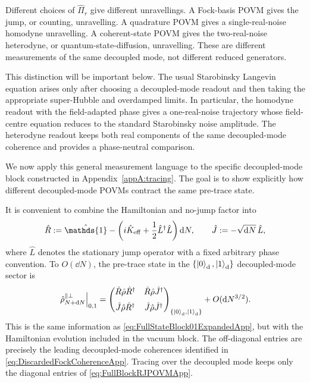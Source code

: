 \documentclass{article}
\newcommand{\openone}{\hat{\mathds{1}}}
\numberwithin{equation}{section}
\begin{document}
	Different choices of \(\hat\Pi_r\) give different unravellings. A Fock-basis POVM gives the jump, or counting, unravelling. A quadrature POVM gives a single-real-noise homodyne unravelling. A coherent-state POVM gives the two-real-noise heterodyne, or quantum-state-diffusion, unravelling. These are different measurements of the same decoupled mode, not different reduced generators.

	This distinction will be important below. The usual Starobinsky Langevin equation arises only after choosing a decoupled-mode readout and then taking the appropriate super-Hubble and overdamped limits. In particular, the homodyne readout with the field-adapted phase gives a one-real-noise trajectory whose field-centre equation reduces to the standard Starobinsky noise amplitude. The heterodyne readout keeps both real components of the same decoupled-mode coherence and provides a phase-neutral comparison.

	We now apply this general measurement language to the specific decoupled-mode block constructed in Appendix~\ref{appA:tracing}. The goal is to show explicitly how different decoupled-mode POVMs contract the same pre-trace state.

	It is convenient to combine the Hamiltonian and no-jump factor into
	\begin{equation}
		\hat R := \openone - \left( i\hat K_{\rm eff} + \frac12\hat L^\dagger\hat L \right)\dd N, \qquad \hat J := -\sqrt{\dd N}\,\hat L,
		\label{eq:RJDefPOVMApp}
	\end{equation}
	where \(\hat L\) denotes the stationary jump operator with a fixed arbitrary phase convention. To \(O(\dd N)\), the pre-trace state in the \(\{\ket{0}_{\rm d},\ket{1}_{\rm d}\}\) decoupled-mode sector is
	\begin{equation}
		\left. \hat\rho_{N+\dd N}^{\parallel\perp} \right|_{0,1} =
		\begin{pmatrix}
			\hat R\hat\rho\hat R^\dagger & \hat R\hat\rho\hat J^\dagger \\[6pt] \hat J\hat\rho\hat R^\dagger & \hat J\hat\rho\hat J^\dagger
		\end{pmatrix}_{\{\ket{0}_{\rm d},\ket{1}_{\rm d}\}}
		+ O(\dd N^{3/2}) .
		\label{eq:FullBlockRJPOVMApp}
	\end{equation}
	This is the same information as \cref{eq:FullStateBlock01ExpandedApp}, but with the Hamiltonian evolution included in the vacuum block. The off-diagonal entries are precisely the leading decoupled-mode coherences identified in \cref{eq:DiscardedFockCoherenceApp}. Tracing over the decoupled mode keeps only the diagonal entries of \cref{eq:FullBlockRJPOVMApp}.
\end{document}
